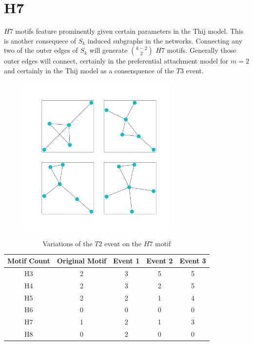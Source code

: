 \section{H7}
$H7$ motifs feature prominently given certain parameters in the Thij model. This is another consequece
of $S_k$ induced subgraphs in the networks. Connecting any two of the outer edges of $S_k$
will generate ${k-2 \choose 2}$ $H7$ motifs. Generally those outer edges will connect, certainly 
in the preferential attachment model for $m=2$ and certainly in the Thij model as a consenquence 
of the $T3$ event.

\begin{figure}[!ht]
    \includegraphics[width=8cm]{Images/H7_evolution.png}
    \centering
\end{figure}
\FloatBarrier

\begin{table}
    \centering
    \begin{tabular}{||c c c c c||} 
    \hline
    Motif Count & Original Motif & Event 1 & Event 2 & Event 3 \\ [0.5ex] 
    \hline\hline
    H3 & 2 & 3 & 5 & 5\\ 
    \hline
    H4 & 2 & 3 & 2 & 5 \\
    \hline
    H5 & 2 & 2 & 1 & 4 \\
    \hline
    H6 & 0 & 0 & 0 & 0 \\
    \hline
    H7 & 1 & 2 & 1 & 3 \\
    \hline
    H8 & 0 & 2 & 0 & 0\\
    \hline
   \end{tabular}
   \caption{Variations of the $T2$ event on the $H7$ motif}
   \label{table:5}
\end{table}

